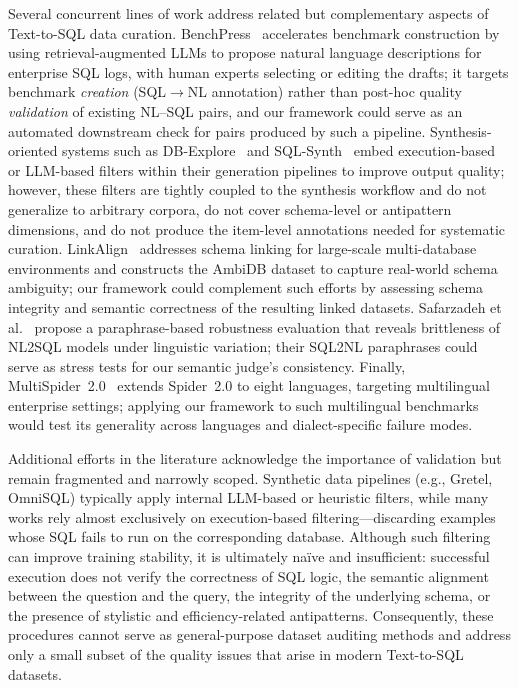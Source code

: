 \documentclass[print]{einformatica}
\begin{document}
Several concurrent lines of work address related but complementary aspects of Text-to-SQL data curation. BenchPress~\cite{wenz2025benchpress} accelerates benchmark construction by using retrieval-augmented LLMs to propose natural language descriptions for enterprise SQL logs, with human experts selecting or editing the drafts; it targets benchmark \emph{creation} (SQL$\rightarrow$NL annotation) rather than post-hoc quality \emph{validation} of existing NL--SQL pairs, and our framework could serve as an automated downstream check for pairs produced by such a pipeline. Synthesis-oriented systems such as DB-Explore~\cite{ma2025dbexplore} and SQL-Synth~\cite{wang2025sqlsynth} embed execution-based or LLM-based filters within their generation pipelines to improve output quality; however, these filters are tightly coupled to the synthesis workflow and do not generalize to arbitrary corpora, do not cover schema-level or antipattern dimensions, and do not produce the item-level annotations needed for systematic curation. LinkAlign~\cite{wang2025linkalign} addresses schema linking for large-scale multi-database environments and constructs the AmbiDB dataset to capture real-world schema ambiguity; our framework could complement such efforts by assessing schema integrity and semantic correctness of the resulting linked datasets. Safarzadeh et al.~\cite{safarzadeh2025sql2nl} propose a paraphrase-based robustness evaluation that reveals brittleness of NL2SQL models under linguistic variation; their SQL2NL paraphrases could serve as stress tests for our semantic judge's consistency. Finally, MultiSpider~2.0~\cite{pham2025multispider2} extends Spider~2.0 to eight languages, targeting multilingual enterprise settings; applying our framework to such multilingual benchmarks would test its generality across languages and dialect-specific failure modes.

Additional efforts in the literature acknowledge the importance of validation but remain fragmented and narrowly scoped. Synthetic data pipelines (e.g., Gretel, OmniSQL) typically apply internal LLM-based or heuristic filters, while many works rely almost exclusively on execution-based filtering---discarding examples whose SQL fails to run on the corresponding database. Although such filtering can improve training stability, it is ultimately naïve and insufficient: successful execution does not verify the correctness of SQL logic, the semantic alignment between the question and the query, the integrity of the underlying schema, or the presence of stylistic and efficiency-related antipatterns. Consequently, these procedures cannot serve as general-purpose dataset auditing methods and address only a small subset of the quality issues that arise in modern Text-to-SQL datasets.
\end{document}
